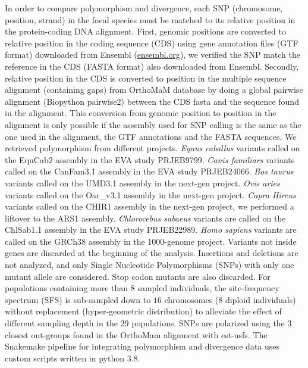 \documentclass{article}
\begin{document}
    In order to compare polymorphism and divergence, each SNP (chromosome, position, strand) in the focal species must be matched to its relative position in the protein-coding DNA alignment.
    First, genomic positions are converted to relative position in the coding sequence (CDS) using gene annotation files (GTF format) downloaded from Ensembl (\url{ensembl.org}), we verified the SNP match the reference in the CDS (FASTA format) also downloaded from Ensembl.
    Secondly, relative position in the CDS is converted to position in the multiple sequence alignment (containing gaps) from OrthoMaM database\cite{ranwez_orthomam_2007, douzery_orthomam_2014, scornavacca_orthomam_2019} by doing a global pairwise alignment (Biopython pairwise2) between the CDS fasta and the sequence found in the alignment.
    This conversion from genomic position to position in the alignment is only possible if the assembly used for SNP calling is the same as the one used in the alignment, the GTF annotations and the FASTA sequences.
    We retrieved polymorphism from different projects.
    \textit{Equus caballus} variants called on the EquCab2 assembly in the EVA study PRJEB9799.
    \textit{Canis familiars} variants called on the CanFam3.1 assembly in the EVA study PRJEB24066.
    \textit{Bos taurus} variants called on the UMD3.1 assembly in the next-gen project.
    \textit{Ovis aries} variants called on the Oar\_v3.1 assembly in the next-gen project.
    \textit{Capra Hircus} variants called on the CHIR1 assembly in the next-gen project, we performed a liftover to the ARS1 assembly.
    \textit{Chlorocebus sabaeus} variants are called on the ChlSab1.1 assembly in the EVA study PRJEB22989\cite{svardal_ancient_2017}.
    \textit{Homo sapiens} variants are called on the GRCh38 assembly in the 1000-genome project\cite{consortium_integrated_2012, the1000genomesprojectconsortium_global_2015}.
    Variants not inside genes are discarded at the beginning of the analysis.
    Insertions and deletions are not analyzed, and only Single Nucleotide Polymorphisms (SNPs) with only one mutant allele are considered.
    Stop codon mutants are also discarded.
    For populations containing more than $8$ sampled individuals, the site-frequency spectrum (SFS) is sub-sampled down to $16$ chromosomes ($8$ diploid individuals) without replacement (hyper-geometric distribution) to alleviate the effect of different sampling depth in the $29$ populations.
    SNPs are polarized using the $3$ closest out-groups found in the OrthoMam alignment with est-usfs\cite{keightley_inferring_2018}.
    The Snakemake pipeline for integrating polymorphism and divergence data uses custom scripts written in python 3.8.
\end{document}
